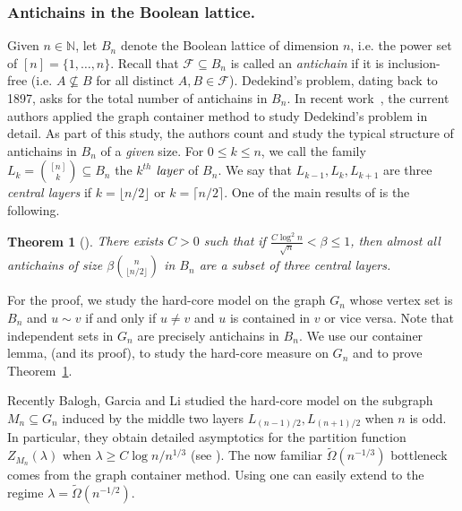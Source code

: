 \documentclass[10pt,a4paper]{amsart}
\newtheorem{thm}{Theorem}[section]
\theoremstyle{definition}
\newcommand{\cF}{\mathcal{F} }
\newcommand{\0}[0]{\emptyset}
\newcommand{\lam}{\lambda}
\begin{document}
\subsubsection*{Antichains in the Boolean lattice.} Given $n\in\mathbb N$, let $B_n$ denote the Boolean lattice of dimension $n$, i.e. the power set of $[n]=\{1,\ldots,n\}$.
Recall that $\cF \subseteq B_n$ is called an \emph{antichain} if it is inclusion-free (i.e. $A \not \subseteq B$ for all distinct $A,B\in \cF$). Dedekind's problem, dating back to 1897, asks for the total number of antichains in $B_n$. In recent work~\cite{sparsesperner}, the current authors applied the graph container method to study Dedekind's problem in detail. As part of this study, the authors count and study the typical structure of antichains in $B_n$ of a \emph{given} size. For $0\leq k\leq n$, we call the family $L_k=\binom{[n]}{k}\subseteq B_n$ the $k^{th}$ $\emph{layer}$ of $B_n$. We say that $L_{k-1},L_{k}, L_{k+1}$ are three \emph{central layers} if $k=\lfloor n/2 \rfloor$ or $k= \lceil n/2 \rceil$.
One of the {main} results of \cite{sparsesperner} is the following.

\begin{thm}[{\cite[Theorem 1.5]{sparsesperner}}]\label{thm:antichain}
    There exists $C>0$ such that if  $\frac{C\log^2 n}{\sqrt{n}}<\beta\leq 1$, then almost all antichains of size $\beta \displaystyle \binom{n}{\lfloor n/2\rfloor}$ in $B_n$ are a subset of three central layers.
\end{thm}

For the proof, we study the hard-core model on the graph $G_n$ whose vertex set is $B_n$ and $u\sim v$ if and only if {$u\neq v$ and} $u$ is contained in $v$ or vice versa. Note that independent sets in $G_n$ are precisely antichains in $B_n$. We use our container lemma,  (and its proof), to study the hard-core measure on $G_n$ and to prove Theorem~\ref{thm:antichain}.

Recently Balogh, Garcia and Li \cite{balogh2021independent} studied the hard-core model on the subgraph $M_n\subseteq G_n$ induced by the middle two layers $L_{(n-1)/2}, L_{(n+1)/2}$ when $n$ is odd. In particular, they obtain detailed asymptotics for the partition function $Z_{M_n}(\lam)$ when $\lam\geq C \log n/n^{1/3}$ (see \cite[Theorem 5.1]{balogh2021independent}). The now familiar $\tilde\Omega(n^{-1/3})$ bottleneck comes from the graph container method. Using  one can easily extend \cite[Theorem 5.1]{balogh2021independent} to the regime $\lam= \tilde\Omega(n^{-1/2})$.
\end{document}
